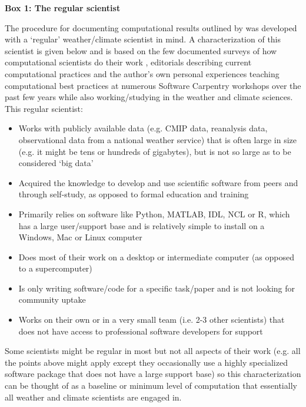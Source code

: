 \textbf{Box 1: The regular scientist}

The procedure for documenting computational results outlined by \citet{Irving2016} was developed with a `regular' weather/climate scientist in mind. A characterization of this scientist is given below and is based on the few documented surveys of how computational scientists do their work \citep{Hannay2009,Stodden2010}, editorials describing current computational practices \citep[e.g.][]{Easterbrook2014} and the author's own personal experiences teaching computational best practices at numerous Software Carpentry workshops \citep{Wilson2014} over the past few years while also working/studying in the weather and climate sciences. This regular scientist:
\begin{itemize}
\item Works with publicly available data (e.g. CMIP data, reanalysis data, observational data from a national weather service) that is often large in size (e.g. it might be tens or hundreds of gigabytes), but is not so large as to be considered `big data' 
\item Acquired the knowledge to develop and use scientific software from peers and through self-study, as opposed to formal education and training
\item Primarily relies on software like Python, MATLAB, IDL, NCL or R, which has a large user/support base and is relatively simple to install on a Windows, Mac or Linux computer
\item Does most of their work on a desktop or intermediate computer (as opposed to a supercomputer)
\item Is only writing software/code for a specific task/paper and is not looking for community uptake  
\item Works on their own or in a very small team (i.e. 2-3 other scientists) that does not have access to professional software developers for support
\end{itemize}

Some scientists might be regular in most but not all aspects of their work (e.g. all the points above might apply except they occasionally use a highly specialized software package that does not have a large support base) so this characterization can be thought of as a baseline or minimum level of computation that essentially all weather and climate scientists are engaged in.  

  
  
  